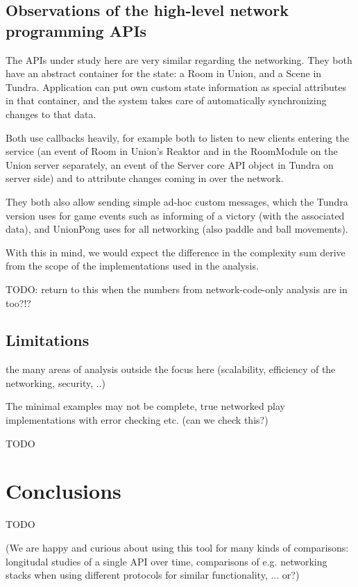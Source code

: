 \documentclass[conference]{IEEEtran}
\begin{document}
\subsection{Observations of the high-level network programming APIs%
  \label{observations-of-the-high-level-network-programming-apis}%
}

The APIs under study here are very similar regarding the
networking. They both have an abstract container for the state: a Room
in Union, and a Scene in Tundra. Application can put own custom state
information as special attributes in that container, and the system
takes care of automatically synchronizing changes to that data.

Both use callbacks heavily, for example both to listen to new clients
entering the service (an event of Room in Union's Reaktor and in the
RoomModule on the Union server separately, an event of the Server core
API object in Tundra on server side) and to attribute changes coming
in over the network.

They both also allow sending simple ad-hoc custom messages, which the
Tundra version uses for game events such as informing of a victory
(with the associated data), and UnionPong uses for all networking
(also paddle and ball movements).

With this in mind, we would expect the difference in the complexity
sum derive from the scope of the implementations used in the analysis.

TODO: return to this when the numbers from network-code-only analysis are in too?!?


\subsection{Limitations%
  \label{limitations}%
}

the many areas of analysis outside the focus here (scalability,
efficiency of the networking, security, ..)

The minimal examples may not be complete, true networked play
implementations with error checking etc. (can we check this?)

TODO


\section{Conclusions%
  \label{conclusions}%
}

TODO

(We are happy and curious about using this tool for many kinds of
comparisons: longitudal studies of a single API over time, comparisons
of e.g. networking stacks when using different protocols for similar
functionality, ... or?)
\end{document}
